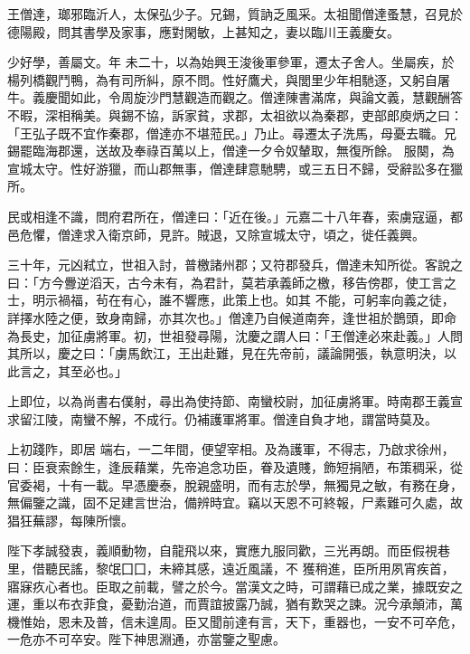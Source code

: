 
\begin{pinyinscope}

 王僧達，瑯邪臨沂人，太保弘少子。兄錫，質訥乏風采。太祖聞僧達蚤慧，召見於德陽殿，問其書學及家事，應對閑敏，上甚知之，妻以臨川王義慶女。



 少好學，善屬文。年
 未二十，以為始興王浚後軍參軍，遷太子舍人。坐屬疾，於楊列橋觀鬥鴨，為有司所糾，原不問。性好鷹犬，與閭里少年相馳逐，又躬自屠牛。義慶聞如此，令周旋沙門慧觀造而觀之。僧達陳書滿席，與論文義，慧觀酬答不暇，深相稱美。與錫不協，訴家貧，求郡，太祖欲以為秦郡，吏部郎庾炳之曰：「王弘子既不宜作秦郡，僧達亦不堪蒞民。」乃止。尋遷太子洗馬，母憂去職。兄錫罷臨海郡還，送故及奉祿百萬以上，僧達一夕令奴輦取，無復所餘。
 服闋，為宣城太守。性好游獵，而山郡無事，僧達肆意馳騁，或三五日不歸，受辭訟多在獵所。



 民或相逢不識，問府君所在，僧達曰：「近在後。」元嘉二十八年春，索虜寇逼，都邑危懼，僧達求入衛京師，見許。賊退，又除宣城太守，頃之，徙任義興。



 三十年，元凶弒立，世祖入討，普檄諸州郡；又符郡發兵，僧達未知所從。客說之曰：「方今釁逆滔天，古今未有，為君計，莫若承義師之檄，移告傍郡，使工言之士，明示禍福，茍在有心，誰不響應，此策上也。如其
 不能，可躬率向義之徒，詳擇水陸之便，致身南歸，亦其次也。」僧達乃自候道南奔，逢世祖於鵲頭，即命為長史，加征虜將軍。初，世祖發尋陽，沈慶之謂人曰：「王僧達必來赴義。」人問其所以，慶之曰：「虜馬飲江，王出赴難，見在先帝前，議論開張，執意明決，以此言之，其至必也。」



 上即位，以為尚書右僕射，尋出為使持節、南蠻校尉，加征虜將軍。時南郡王義宣求留江陵，南蠻不解，不成行。仍補護軍將軍。僧達自負才地，謂當時莫及。



 上初踐阼，即居
 端右，一二年間，便望宰相。及為護軍，不得志，乃啟求徐州，曰：臣衰索餘生，逢辰藉業，先帝追念功臣，眷及遺賤，飾短捐陋，布策稠采，從官委褐，十有一載。早憑慶泰，脫親盛明，而有志於學，無獨見之敏，有務在身，無偏鑒之識，固不足建言世治，備辨時宜。竊以天恩不可終報，尸素難可久處，故猖狂蕪謬，每陳所懷。



 陛下孝誠發衷，義順動物，自龍飛以來，實應九服同歡，三光再朗。而臣假視巷里，借聽民謠，黎氓囗囗，未締其感，遠近風議，不
 獲稍進，臣所用夙宵疾首，寤寐疚心者也。臣取之前載，譬之於今。當漢文之時，可謂藉已成之業，據既安之運，重以布衣菲食，憂勤治道，而賈誼披露乃誠，猶有歎哭之諫。況今承顛沛，萬機惟始，恩未及普，信未遑周。臣又聞前達有言，天下，重器也，一安不可卒危，一危亦不可卒安。陛下神思淵通，亦當鑒之聖慮。




\end{pinyinscope}
